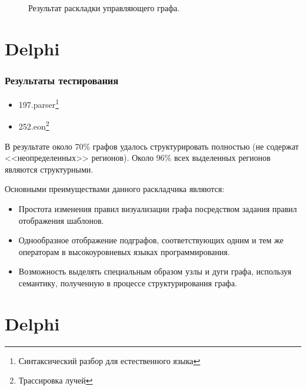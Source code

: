 \documentclass{beamer}
\begin{document}
\begin{frame}
\begin{figure}[htbp]
\begin{minipage}[b]{0.49\linewidth}
	\end{minipage}
	\tiny{
	\caption{Результат раскладки управляющего графа.}
	}
	\label{fig:image1}
\end{figure}
\end{frame}


\section{Delphi}
\begin{frame}
\frametitle{Результаты тестирования}
\footnotesize{
\begin{itemize}
	\item 197.parser\footnote{Синтаксический разбор для естественного языка}
	\item 252.eon\footnote{Трассировка лучей}
\end{itemize}

В результате около 70\% графов удалось структурировать полностью (не содержат <<неопределенных>> регионов). Около 96\% всех выделенных регионов являются структурными.

Основными преимуществами данного раскладчика являются:
\begin{itemize}
	\item Простота изменения правил визуализации графа посредством задания правил отображения шаблонов.
	\item Однообразное отображение подграфов, соответствующих одним и тем же операторам в высокоуровневых языках программирования.
	\item Возможность выделять специальным образом узлы и дуги графа, используя семантику, полученную в процессе структурирования графа.
\end{itemize}
}
\end{frame}


\section{Delphi}
\maketitle
\end{document}
